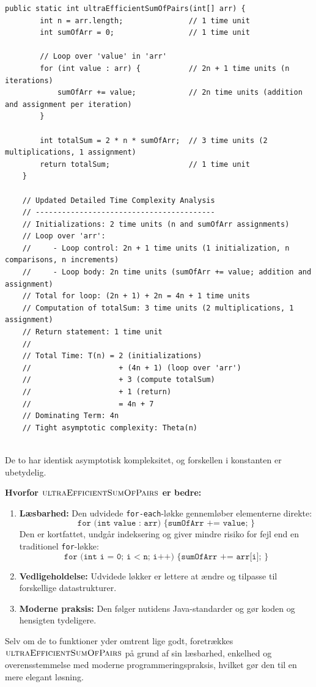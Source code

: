 \begin{lstlisting}[style = javaStyle, caption={Ultraeffektiv sum af par med analyse}, label={lst:java_ultra_efficient_sum_pairs_analysis}]
    public static int ultraEfficientSumOfPairs(int[] arr) {
        int n = arr.length;               // 1 time unit
        int sumOfArr = 0;                 // 1 time unit
    
        // Loop over 'value' in 'arr'
        for (int value : arr) {           // 2n + 1 time units (n iterations)
            sumOfArr += value;            // 2n time units (addition and assignment per iteration)
        }
    
        int totalSum = 2 * n * sumOfArr;  // 3 time units (2 multiplications, 1 assignment)
        return totalSum;                  // 1 time unit
    }
    
    // Updated Detailed Time Complexity Analysis
    // -----------------------------------------
    // Initializations: 2 time units (n and sumOfArr assignments)
    // Loop over 'arr':
    //     - Loop control: 2n + 1 time units (1 initialization, n comparisons, n increments)
    //     - Loop body: 2n time units (sumOfArr += value; addition and assignment)
    // Total for loop: (2n + 1) + 2n = 4n + 1 time units
    // Computation of totalSum: 3 time units (2 multiplications, 1 assignment)
    // Return statement: 1 time unit
    //
    // Total Time: T(n) = 2 (initializations)
    //                    + (4n + 1) (loop over 'arr')
    //                    + 3 (compute totalSum)
    //                    + 1 (return)
    //                    = 4n + 7
    // Dominating Term: 4n
    // Tight asymptotic complexity: Theta(n)
    
\end{lstlisting}  


De to har identisk asymptotisk kompleksitet, og forskellen i konstanten er ubetydelig.

\textbf{Hvorfor $\proc{ultraEfficientSumOfPairs}$ er bedre:}
\begin{enumerate}
    \item \textbf{Læsbarhed:} Den udvidede \texttt{for-each}-løkke gennemløber elementerne direkte:
    \[
    \texttt{for (int value : arr) \{ sumOfArr += value; \}}
    \]
    Den er kortfattet, undgår indeksering og giver mindre risiko for fejl end en traditionel \texttt{for}-løkke:
    \[
    \texttt{for (int i = 0; i < n; i++) \{ sumOfArr += arr[i]; \}}
    \]
    \item \textbf{Vedligeholdelse:} Udvidede løkker er lettere at ændre og tilpasse til forskellige datastrukturer.
    \item \textbf{Moderne praksis:} Den følger nutidens Java-standarder og gør koden og hensigten tydeligere.
\end{enumerate}

Selv om de to funktioner yder omtrent lige godt, foretrækkes $\proc{ultraEfficientSumOfPairs}$ på grund af sin læsbarhed, enkelhed og overensstemmelse med moderne programmeringspraksis, hvilket gør den til en mere elegant løsning.

